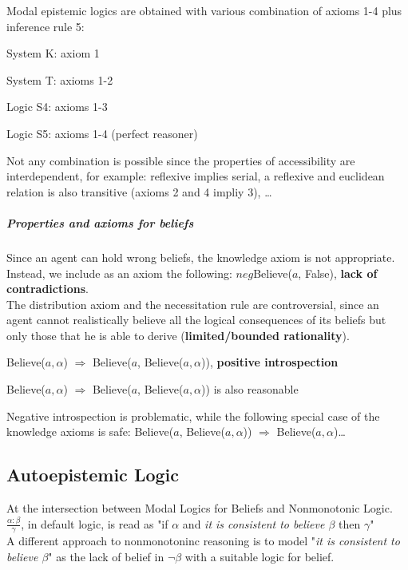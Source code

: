 \documentclass[10pt]{report}
\begin{document}
Modal epistemic logics are obtained with various combination of axioms 1-4 plus inference rule 5:
\begin{list}{}{}
	\item System K: axiom 1
	\item System T: axioms 1-2
	\item Logic S4: axioms 1-3
	\item Logic S5: axioms 1-4 (perfect reasoner)
\end{list}
Not any combination is possible since the properties of accessibility are interdependent, for example: reflexive implies serial, a reflexive and euclidean relation is also transitive (axioms 2 and 4 impliy 3), \ldots
\subparagraph{Properties and axioms for beliefs} Since an agent can hold wrong beliefs, the knowledge axiom is not appropriate. Instead, we include as an axiom the following: $neg$Believe($a$, False), \textbf{lack of contradictions}.\\The distribution axiom and the necessitation rule are controversial, since an agent cannot realistically believe all the logical consequences of its beliefs but only those that he is able to derive (\textbf{limited/bounded rationality}).
\begin{list}{}{}
	\item Believe($a,\alpha$) $\Rightarrow$ Believe($a$, Believe($a,\alpha$)), \textbf{positive introspection}
	\item Believe($a,\alpha$) $\Rightarrow$ Believe($a$, Believe($a,\alpha$)) is also reasonable
\end{list}
Negative introspection is problematic, while the following special case of the knowledge axioms is safe: Believe($a$, Believe($a,\alpha$)) $\Rightarrow$ Believe($a,\alpha$)\ldots
\subsection{Autoepistemic Logic}
At the intersection between Modal Logics for Beliefs and Nonmonotonic Logic.\\
$\frac{\alpha : \beta}{\gamma}$, in default logic, is read as "if $\alpha$ and \textit{it is consistent to believe $\beta$} then $\gamma$"\\
A different approach to nonmonotoninc reasoning is to model "\textit{it is consistent to believe $\beta$}" as the lack of belief in $\neg\beta$ with a suitable logic for belief.
\end{document}
